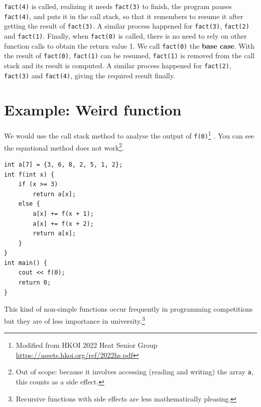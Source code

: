 \texttt{fact(4)} is called, realizing it needs \texttt{fact(3)} to finish, the program pauses \texttt{fact(4)}, and puts it in the call stack, so that it remembers to resume it after getting the result of \texttt{fact(3)}. A similar process happened for \texttt{fact(3)}, \texttt{fact(2)} and \texttt{fact(1)}. Finally, when \texttt{fact(0)} is called, there is no need to rely on other function calls to obtain the return value 1. We call \texttt{fact(0)} the \textbf{base case}. With the result of \texttt{fact(0)}, \texttt{fact(1)} can be resumed, \texttt{fact(1)} is removed from the call stack and its result is computed. A similar process happened for \texttt{fact(2)}, \texttt{fact(3)} and \texttt{fact(4)}, giving the required result finally.
\vspace{6mm}

\section{Example: Weird function}

We would use the call stack method to analyse the output of \texttt{f(0)}\footnote{Modified from HKOI 2022 Heat Senior Group \url{https://assets.hkoi.org/ref/2022hs.pdf}} . You can see the equational method does not work\footnote{Out of scope: because it involves accessing (reading and writing) the array \texttt{a}, this counts as a side effect.}.

\begin{lstlisting}
int a[7] = {3, 6, 8, 2, 5, 1, 2};
int f(int x) {
    if (x >= 3)
        return a[x];
    else {
        a[x] += f(x + 1);
        a[x] += f(x + 2);
        return a[x];
    }
}
int main() {
    cout << f(0);
    return 0;
} 
\end{lstlisting}

This kind of non-simple functions occur frequently in programming competitions but they are of less importance in university.\footnote{Recursive functions with side effects are less mathematically pleasing.}

